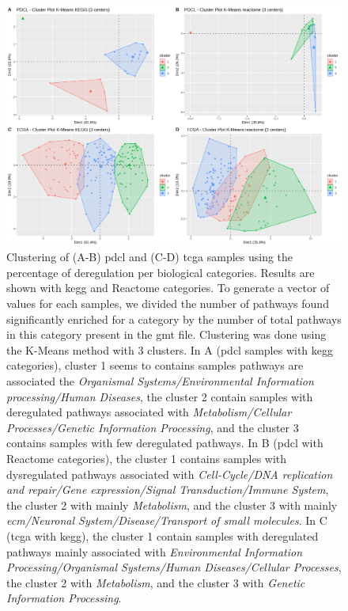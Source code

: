 \begin{figure}
    \begin{center}
        \includegraphics[width=\textwidth]{img/plot_cluster}
        \caption{
            Clustering of (A-B) \acrshort{pdcl} and (C-D) \acrshort{tcga} samples using the percentage of deregulation per biological categories.
            Results are shown with \acrshort{kegg} and Reactome categories.
            To generate a vector of values for each samples, we divided the number of pathways found significantly enriched for a category by the number of total pathways in this category present in the \acrshort{gmt} file.
            Clustering was done using the K-Means method with 3 clusters.
            In A (\acrshort{pdcl} samples with \acrshort{kegg} categories), cluster 1 seems to contains samples pathways are associated the \textit{Organismal Systems/Environmental Information processing/Human Diseases}, the cluster 2 contain samples with deregulated pathways associated with \textit{Metabolism/Cellular Processes/Genetic Information Processing}, and the cluster 3 contains samples with few deregulated pathways.
            In B (\acrshort{pdcl} with Reactome categories), the cluster 1 contains samples with dysregulated pathways associated with \textit{Cell-Cycle/DNA replication and repair/Gene expression/Signal Transduction/Immune System}, the cluster 2 with mainly \textit{Metabolism}, and the cluster 3 with mainly \textit{\acrshort{ecm}/Neuronal System/Disease/Transport of small molecules}.
            In C (\acrshort{tcga} with \acrshort{kegg}), the cluster 1 contain samples with deregulated pathways mainly associated with \textit{Environmental Information Processing/Organismal Systems/Human Diseases/Cellular Processes}, the cluster 2 with \textit{Metabolism}, and the cluster 3 with \textit{Genetic Information Processing}.
}
\end{center}
\end{figure}
